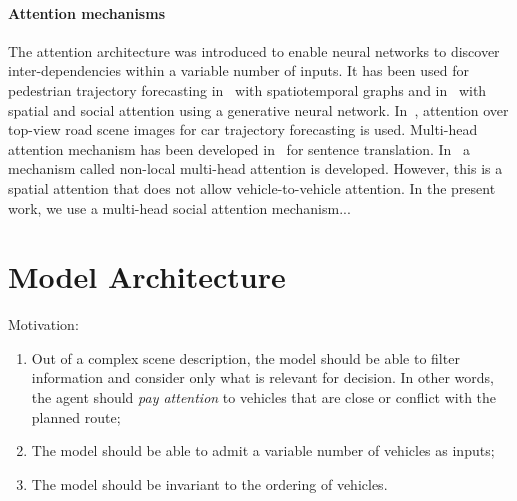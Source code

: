 \documentclass{article}
\begin{document}
{\paragraph{Attention mechanisms} {The attention architecture was introduced to enable neural networks to discover inter-dependencies within a variable number of inputs.
It has been used for pedestrian trajectory forecasting in~\cite{Vemula2018} with spatiotemporal graphs and in~\cite{Sadeghian2019CVPR} with spatial and social attention using a generative neural network. In~\cite{Sadeghian2018ECCV}, attention over top-view road scene images for car trajectory forecasting is used. Multi-head attention mechanism has been developed in~\cite{Vaswani2017} for sentence translation. In~\cite{Messaoud2019} a mechanism called non-local multi-head attention is developed. However, this is a spatial attention that does not allow vehicle-to-vehicle attention. In the present work, we use a multi-head social attention mechanism...}

\section{Model Architecture}

Motivation: 
\begin{enumerate}
	\item Out of a complex scene description, the model should be able to filter information and consider only what is relevant for decision. In other words, the agent should \emph{pay attention} to vehicles that are close or conflict with the planned route;
	\item The model should be able to admit a variable number of vehicles as inputs;
	\item The model should be invariant to the ordering of vehicles.
\end{enumerate}


\begin{figure}[ht]
	\centering
\end{figure}}
\end{document}
